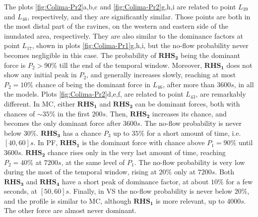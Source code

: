 \documentclass{article}
\begin{document}
The plots \ref{fig:Colima-Pr2}a,b,c and \ref{fig:Colima-Pr2}g,h,i are related to point $L_{39}$ and $L_{46}$, respectively, and they are significantly similar. Those points are both in the most distal part of the ravines, on the western and eastern side of the inundated area, respectively. They are also similar to the dominance factors at point $L_{17}$, shown in plots \ref{fig:Colima-Pr1}g,h,i, but the no-flow probability never becomes negligible in this case. The probability of $\boldsymbol{RHS_2}$ being the dominant force is $P_2>90\%$ till the end of the temporal window. Moreover, $\boldsymbol{RHS_1}$ does not show any initial peak in $P_2$, and generally increases slowly, reaching at most $P_2=10\%$ chance of being the dominant force in $L_{46}$, after more than $3600 s$, in all the models. Plots \ref{fig:Colima-Pr2}d,e,f, are related to point $L_{43}$, are remarkably different. In MC, either $\boldsymbol{RHS_1}$ and $\boldsymbol{RHS_2}$ can be dominant forces, both with chances of $\sim 35\%$ in the first $200 s$. Then, $\boldsymbol{RHS_2}$ increases its chance, and becomes the only dominant force after $3600 s$. The no-flow probability is never below $30\%$. $\boldsymbol{RHS_3}$ has a chance $P_3$ up to $35\%$ for a short amount of time, i.e. $[40, 60] s$. In PF, $\boldsymbol{RHS_1}$ is the dominant force with chance above $P_1=90\%$ until $3600 s$. $\boldsymbol{RHS_2}$ chance rises only in the very last amount of time, reaching $P_2=40\%$ at $7200 s$, at the same level of $P_1$. The no-flow probability is very low during the most of the temporal window, rising at $20\%$ only at $7200 s$. Both $\boldsymbol{RHS_3}$ and $\boldsymbol{RHS_4}$ have a short peak of dominance factor, at about $10\%$ for a few seconds, at $[50,60] s$. Finally, in VS the no-flow probability is never below $20\%$, and the profile is similar to MC, although $\boldsymbol{RHS_1}$ is more relevant, up to $4000 s$. The other force are almost never dominant.
\end{document}
